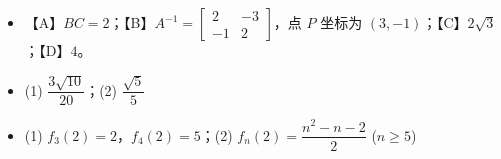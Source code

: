 \begin{itemize}[leftmargin=2.6em]
  \item[\textbf{21.}] 【A】$BC=2$；【B】$A^{-1}=\begin{bmatrix}2 & -3 \\ -1 & 2\end{bmatrix}$，点 $P$ 坐标为 $(3, -1)$；【C】$2\sqrt{3}$；【D】$4$。
  \item[\textbf{22.}] (1) $\dfrac{3\sqrt{10}}{20}$；(2) $\dfrac{\sqrt{5}}{5}$
  \item[\textbf{23.}] (1) $f_3(2)=2$，$f_4(2)=5$；(2) $f_n(2)=\dfrac{n^2-n-2}{2}$ ($n\geqslant 5$)
\end{itemize}
